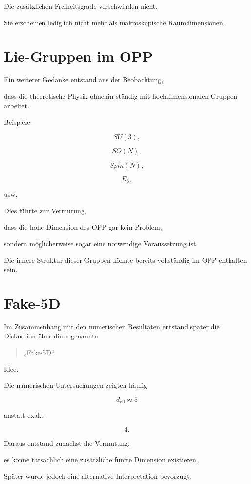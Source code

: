 \begin{itemize}
Die zusätzlichen Freiheitsgrade verschwinden nicht.

Sie erscheinen lediglich nicht mehr als makroskopische Raumdimensionen.


\section*{Lie-Gruppen im OPP}

Ein weiterer Gedanke entstand aus der Beobachtung,

dass die theoretische Physik ohnehin ständig mit hochdimensionalen Gruppen arbeitet.

Beispiele:

\[
SU(3),
\]

\[
SO(N),
\]

\[
Spin(N),
\]

\[
E_8,
\]

usw.

Dies führte zur Vermutung,

dass die hohe Dimension des OPP gar kein Problem,

sondern möglicherweise sogar eine notwendige Voraussetzung ist.

Die innere Struktur dieser Gruppen könnte bereits vollständig im OPP enthalten sein.


\section*{Fake-5D}

Im Zusammenhang mit den numerischen Resultaten entstand später die Diskussion über die sogenannte

\begin{quote}
„Fake-5D“
\end{quote}

Idee.

Die numerischen Untersuchungen zeigten häufig

\[
d_{\mathrm{eff}}
\approx
5
\]

anstatt exakt

\[
4.
\]

Daraus entstand zunächst die Vermutung,

es könne tatsächlich eine zusätzliche fünfte Dimension existieren.

Später wurde jedoch eine alternative Interpretation bevorzugt.


\end{itemize}
